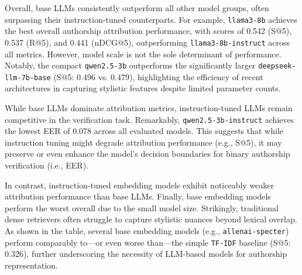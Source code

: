 \documentclass{article}
\begin{document}
Overall, base LLMs consistently outperform all other model groups, often surpassing their instruction-tuned counterparts. For example, \texttt{llama3-8b} achieves the best overall authorship attribution performance, with scores of 0.542 (S@5), 0.537 (R@5), and 0.441 (nDCG@5), outperforming \texttt{llama3-8b-instruct} across all metrics. However, model scale is not the sole determinant of performance. Notably, the compact \texttt{qwen2.5-3b} outperforms the significantly larger \texttt{deepseek-llm-7b-base} (S@5: 0.496 vs. 0.479), highlighting the efficiency of recent architectures in capturing stylistic features despite limited parameter counts.

While base LLMs dominate attribution metrics, instruction-tuned LLMs remain competitive in the verification task. Remarkably, \texttt{qwen2.5-3b-instruct} achieves the lowest EER of 0.078 across all evaluated models. This suggests that while instruction tuning might degrade attribution performance (e.g., S@5), it may preserve or even enhance the model's decision boundaries for binary authorship verification (i.e., EER).

In contrast, instruction-tuned embedding models exhibit noticeably weaker attribution performance than base LLMs. Finally, base embedding models perform the worst overall due to the small model size. Strikingly, traditional dense retrievers often struggle to capture stylistic nuances beyond lexical overlap. As shown in the table, several base embedding models (e.g., \texttt{allenai-specter}) perform comparably to---or even worse than---the simple \texttt{TF-IDF} baseline (S@5: 0.326), further underscoring the necessity of LLM-based models for authorship representation.
\end{document}
